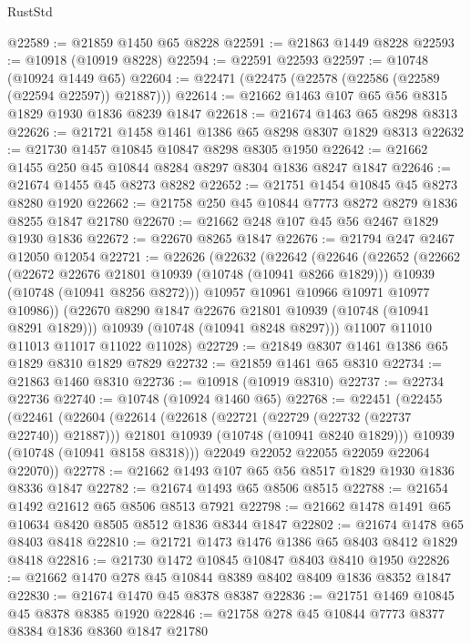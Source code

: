 \begin{lexlean}{RustStd}
\begin{coremodule}
{\begin{coremodule}
{{{{{@22589 := @21859 @1450 @65 @8228
@22591 := @21863 @1449 @8228
@22593 := @10918 (@10919 @8228)
@22594 := @22591 @22593
@22597 := @10748 (@10924 @1449 @65)
@22604 := @22471 (@22475 (@22578 (@22586 (@22589 (@22594 @22597)) @21887)))
@22614 := @21662 @1463 @107 @65 @56 @8315 @1829 @1930 @1836 @8239 @1847
@22618 := @21674 @1463 @65 @8298 @8313
@22626 := @21721 @1458 @1461 @1386 @65 @8298 @8307 @1829 @8313
@22632 := @21730 @1457 @10845 @10847 @8298 @8305 @1950
@22642 := @21662 @1455 @250 @45 @10844 @8284 @8297 @8304 @1836 @8247 @1847
@22646 := @21674 @1455 @45 @8273 @8282
@22652 := @21751 @1454 @10845 @45 @8273 @8280 @1920
@22662 := @21758 @250 @45 @10844 @7773 @8272 @8279 @1836 @8255 @1847 @21780
@22670 := @21662 @248 @107 @45 @56 @2467 @1829 @1930 @1836
@22672 := @22670 @8265 @1847
@22676 := @21794 @247 @2467 @12050 @12054
@22721 := @22626
    (@22632
      (@22642
        (@22646
          (@22652
            (@22662
              (@22672 @22676 @21801 @10939 (@10748 (@10941 @8266 @1829)))
              @10939
              (@10748 (@10941 @8256 @8272)))
            @10957
            @10961
            @10966
            @10971
            @10977
            @10986))
        (@22670 @8290 @1847 @22676 @21801 @10939 (@10748 (@10941 @8291 @1829)))
        @10939
        (@10748 (@10941 @8248 @8297)))
      @11007
      @11010
      @11013
      @11017
      @11022
      @11028)
@22729 := @21849 @8307 @1461 @1386 @65 @1829 @8310 @1829 @7829
@22732 := @21859 @1461 @65 @8310
@22734 := @21863 @1460 @8310
@22736 := @10918 (@10919 @8310)
@22737 := @22734 @22736
@22740 := @10748 (@10924 @1460 @65)
@22768 := @22451
    (@22455
      (@22461
        (@22604
          (@22614
            (@22618 (@22721 (@22729 (@22732 (@22737 @22740)) @21887)))
            @21801
            @10939
            (@10748 (@10941 @8240 @1829)))
          @10939
          (@10748 (@10941 @8158 @8318)))
        @22049
        @22052
        @22055
        @22059
        @22064
        @22070))
@22778 := @21662 @1493 @107 @65 @56 @8517 @1829 @1930 @1836 @8336 @1847
@22782 := @21674 @1493 @65 @8506 @8515
@22788 := @21654 @1492 @21612 @65 @8506 @8513 @7921
@22798 := @21662 @1478 @1491 @65 @10634 @8420 @8505 @8512 @1836 @8344 @1847
@22802 := @21674 @1478 @65 @8403 @8418
@22810 := @21721 @1473 @1476 @1386 @65 @8403 @8412 @1829 @8418
@22816 := @21730 @1472 @10845 @10847 @8403 @8410 @1950
@22826 := @21662 @1470 @278 @45 @10844 @8389 @8402 @8409 @1836 @8352 @1847
@22830 := @21674 @1470 @45 @8378 @8387
@22836 := @21751 @1469 @10845 @45 @8378 @8385 @1920
@22846 := @21758 @278 @45 @10844 @7773 @8377 @8384 @1836 @8360 @1847 @21780
}}}}}
\end{coremodule}}
\end{coremodule}
\end{lexlean}

